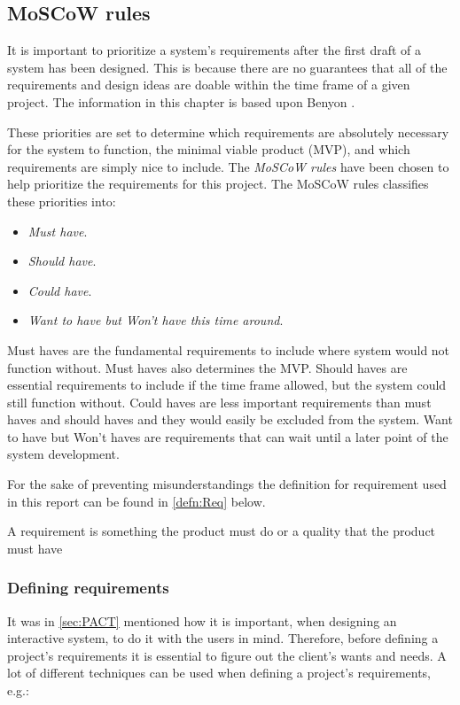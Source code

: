 \subsection{MoSCoW rules}\label{sec:requirements}
It is important to prioritize a system's requirements after the first draft of a system has been designed.
This is because there are no guarantees that all of the requirements and design ideas are doable within the time frame of a given project.
The information in this chapter is based upon Benyon \cite{Benyon}.

These priorities are set to determine which requirements are absolutely necessary for the system to function, the minimal viable product (MVP),
and which requirements are simply nice to include.
The \textit{MoSCoW rules}
have been chosen to help prioritize the requirements for this project.
The MoSCoW rules classifies these priorities into:

\begin{itemize}
    \item \textit{Must have}.
    \item \textit{Should have}.
    \item \textit{Could have}.
    \item \textit{Want to have but Won’t have this time around}.
\end{itemize}

Must haves are the fundamental requirements to include where system would not function without.
Must haves also determines the MVP.
Should haves are essential requirements to include if the time frame allowed, but the system could still function without.
Could haves are less important requirements than must haves and should haves and they would easily be excluded from the system.
Want to have but Won't haves are requirements that can wait until a later point of the system development.

For the sake of preventing misunderstandings the definition for requirement used in this report \citep[p.~147]{Benyon} can be found in \cref{defn:Req} below.

\begin{defn}\label{defn:Req}
    A requirement is something the product must do or a quality that the product must have
\end{defn}

\subsubsection{Defining requirements} \label{sec:requirementsdefinition}
It was in \cref{sec:PACT} mentioned how it is important, when designing an interactive system, to do it with the users in mind.
Therefore, before defining a project's requirements it is essential to figure out the client's wants and needs.
A lot of different techniques can be used when defining a project's requirements, e.g.:

